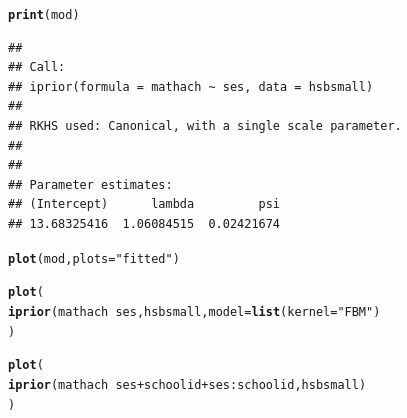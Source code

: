 \documentclass{beamer}\usepackage[]{graphicx}\usepackage[]{color}
\makeatletter
\newcommand{\hlstr}[1]{\textcolor[rgb]{0.192,0.494,0.8}{#1}}%
\newcommand{\hlopt}[1]{\textcolor[rgb]{0,0,0}{#1}}%
\newcommand{\hlstd}[1]{\textcolor[rgb]{0.345,0.345,0.345}{#1}}%
\newcommand{\hlkwc}[1]{\textcolor[rgb]{0.333,0.667,0.333}{#1}}%
\newcommand{\hlkwd}[1]{\textcolor[rgb]{0.737,0.353,0.396}{\textbf{#1}}}%
\newenvironment{kframe}{%
 \def\at@end@of@kframe{}%
 \ifinner\ifhmode%
  \def\at@end@of@kframe{\end{minipage}}%
  \begin{minipage}{\columnwidth}%
 \fi\fi%
 \def\FrameCommand##1{\hskip\@totalleftmargin \hskip-\fboxsep
 \colorbox{shadecolor}{##1}\hskip-\fboxsep
     \hskip-\linewidth \hskip-\@totalleftmargin \hskip\columnwidth}%
 \MakeFramed {\advance\hsize-\width
   \@totalleftmargin\z@ \linewidth\hsize
   \@setminipage}}%
 {\par\unskip\endMakeFramed%
 \at@end@of@kframe}
\newenvironment{knitrout}{}{} %
\makeatother
\begin{document}
\newsavebox{\ipriordemoc}
\begin{lrbox}{\ipriordemoc}
\begin{knitrout}\small
{}\color{fgcolor}\begin{kframe}
\begin{alltt}
\hlkwd{print}\hlstd{(mod)}
\end{alltt}
\begin{verbatim}
## 
## Call:
## iprior(formula = mathach ~ ses, data = hsbsmall)
## 
## RKHS used: Canonical, with a single scale parameter.
## 
## 
## Parameter estimates:
## (Intercept)      lambda         psi 
## 13.68325416  1.06084515  0.02421674
\end{verbatim}
\end{kframe}
\end{knitrout}
\end{lrbox}

\newsavebox{\ipriordemod}
\begin{lrbox}{\ipriordemod}
\begin{knitrout}\small
{}\color{fgcolor}\begin{kframe}
\begin{alltt}
\hlkwd{plot}\hlstd{(mod,} \hlkwc{plots} \hlstd{=} \hlstr{"fitted"}\hlstd{)}
\end{alltt}
\end{kframe}
\end{knitrout}
\end{lrbox}

\newsavebox{\ipriordemoe}
\begin{lrbox}{\ipriordemoe}
\begin{knitrout}\small
{}\color{fgcolor}\begin{kframe}
\begin{alltt}
\hlkwd{plot}(
  \hlkwd{iprior}(mathach ~ ses, hsbsmall, model = \hlkwd{list}(kernel = \hlstr{"FBM"})
)
\end{alltt}
\end{kframe}
\end{knitrout}
\end{lrbox}



\newsavebox{\ipriordemof}
\begin{lrbox}{\ipriordemof}
\begin{knitrout}\small
{}\color{fgcolor}\begin{kframe}
\begin{alltt}
\hlkwd{plot}\hlstd{(}
  \hlkwd{iprior}\hlstd{(mathach} \hlopt{~} \hlstd{ses} \hlopt{+} \hlstd{schoolid} \hlopt{+} \hlstd{ses}\hlopt{:}\hlstd{schoolid, hsbsmall)}
\hlstd{)}
\end{alltt}
\end{kframe}
\end{knitrout}
\end{lrbox}
\end{document}
